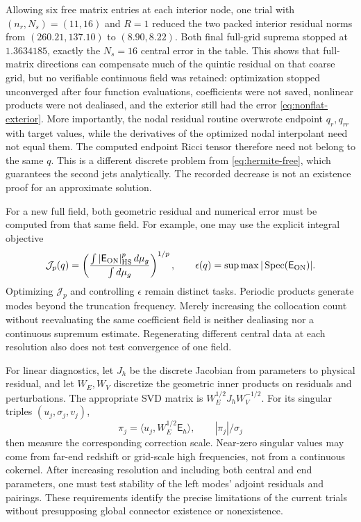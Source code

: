 \documentclass[a4paper,11pt]{article}
\numberwithin{equation}{section}
\theoremstyle{definition}
\newcommand{\spec}{\operatorname{Spec}}
\begin{document}
Allowing six free matrix entries at each interior node, one trial with $(n_r,N_s)=(11,16)$ and $R=1$ reduced the two packed interior residual norms from $(260.21,137.10)$ to $(8.90,8.22)$.
Both final full-grid suprema stopped at $1.3634185$, exactly the $N_s=16$ central error in the table.
This shows that full-matrix directions can compensate much of the quintic residual on that coarse grid, but no verifiable continuous field was retained:
optimization stopped unconverged after four function evaluations, coefficients were not saved, nonlinear products were not dealiased, and the exterior still had the error \eqref{eq:nonflat-exterior}.
More importantly, the nodal residual routine overwrote endpoint $q_r,q_{rr}$ with target values, while the derivatives of the optimized nodal interpolant need not equal them.
The computed endpoint Ricci tensor therefore need not belong to the same $q$.
This is a different discrete problem from \eqref{eq:hermite-free}, which guarantees the second jets analytically.
The recorded decrease is not an existence proof for an approximate solution.

For a new full field, both geometric residual and numerical error must be computed from that same field.
For example, one may use the explicit integral objective
\[
 \mathcal J_p(q)=
 \left(\frac{\int |\mathsf E_{\rm ON}|_{\rm HS}^p\,d\mu_g}
                  {\int d\mu_g}\right)^{1/p},
 \qquad \epsilon(q)=\sup\max|\spec(\mathsf E_{\rm ON})|.
\]
Optimizing $\mathcal J_p$ and controlling $\epsilon$ remain distinct tasks.
Periodic products generate modes beyond the truncation frequency.
Merely increasing the collocation count without reevaluating the same coefficient field is neither dealiasing nor a continuous supremum estimate.
Regenerating different central data at each resolution also does not test convergence of one field.

For linear diagnostics, let $J_h$ be the discrete Jacobian from parameters to physical residual, and let $W_E,W_V$ discretize the geometric inner products on residuals and perturbations.
The appropriate SVD matrix is $W_E^{1/2}J_hW_V^{-1/2}$.
For its singular triples $(u_j,\sigma_j,v_j)$,
\[
 \pi_j=\langle u_j,W_E^{1/2}\mathsf E_h\rangle,\qquad
 |\pi_j|/\sigma_j
\]
then measure the corresponding correction scale.
Near-zero singular values may come from far-end redshift or grid-scale high frequencies, not from a continuous cokernel.
After increasing resolution and including both central and end parameters, one must test stability of the left modes' adjoint residuals and pairings.
These requirements identify the precise limitations of the current trials without presupposing global connector existence or nonexistence.
\end{document}
